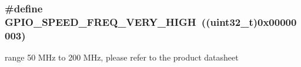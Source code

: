\subsubsection[{\texorpdfstring{G\+P\+I\+O\+\_\+\+S\+P\+E\+E\+D\+\_\+\+F\+R\+E\+Q\+\_\+\+V\+E\+R\+Y\+\_\+\+H\+I\+GH}{GPIO_SPEED_FREQ_VERY_HIGH}}]{\setlength{\rightskip}{0pt plus 5cm}\#define G\+P\+I\+O\+\_\+\+S\+P\+E\+E\+D\+\_\+\+F\+R\+E\+Q\+\_\+\+V\+E\+R\+Y\+\_\+\+H\+I\+GH~((uint32\+\_\+t)0x00000003)}\hypertarget{group___g_p_i_o__speed__define_ga1944cf10e2ab172810d38b681d40b771}{}\label{group___g_p_i_o__speed__define_ga1944cf10e2ab172810d38b681d40b771}
range 50 M\+Hz to 200 M\+Hz, please refer to the product datasheet 